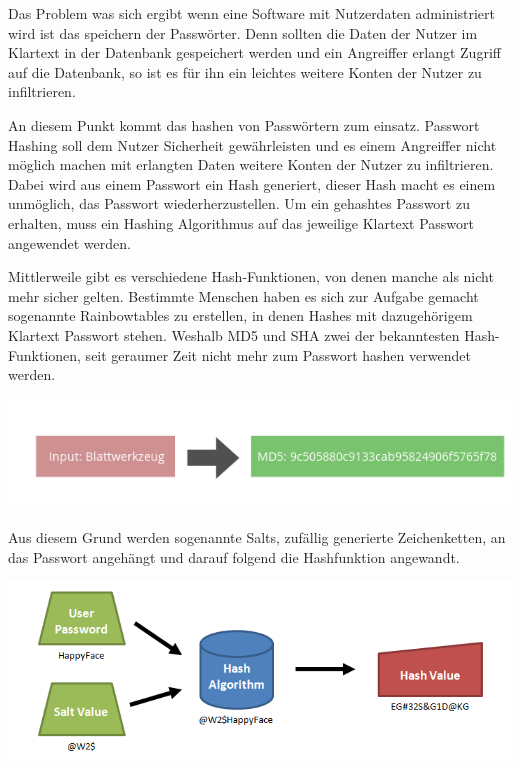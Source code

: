 \documentclass[11pt]{article}
\begin{document}
		\begin{flushleft}
			Das Problem was sich ergibt wenn eine Software mit Nutzerdaten administriert wird ist das speichern der Passwörter. Denn sollten die Daten der Nutzer im Klartext in der Datenbank gespeichert werden und ein Angreiffer erlangt Zugriff auf die Datenbank, so ist es für ihn ein leichtes weitere Konten der Nutzer zu infiltrieren.\par\bigskip
		
			An diesem Punkt kommt das hashen von Passwörtern zum einsatz. Passwort Hashing soll dem Nutzer Sicherheit gewährleisten und es einem Angreiffer nicht möglich machen mit erlangten Daten weitere Konten der Nutzer zu infiltrieren. Dabei wird aus einem Passwort ein Hash generiert, dieser Hash macht es einem unmöglich, das Passwort wiederherzustellen. Um ein gehashtes Passwort zu erhalten, muss ein Hashing Algorithmus auf das jeweilige Klartext Passwort angewendet werden.\par\bigskip
			
			Mittlerweile gibt es verschiedene Hash-Funktionen, von denen manche als nicht mehr sicher gelten. Bestimmte Menschen haben es sich zur Aufgabe gemacht sogenannte Rainbowtables zu erstellen, in denen Hashes mit dazugehörigem Klartext Passwort stehen. Weshalb MD5 und SHA zwei der bekanntesten Hash-Funktionen, seit geraumer Zeit nicht mehr zum Passwort hashen verwendet werden.
			
			\includegraphics[scale=2]{hash.png}\par\bigskip
			
			Aus diesem Grund werden sogenannte Salts, zufällig generierte Zeichenketten, an das Passwort angehängt und darauf folgend die Hashfunktion angewandt. 
			
			\begin{center}
				\includegraphics[scale=0.4]{salted_hash.png}
			\end{center}
		\end{flushleft}
	
\end{document}
